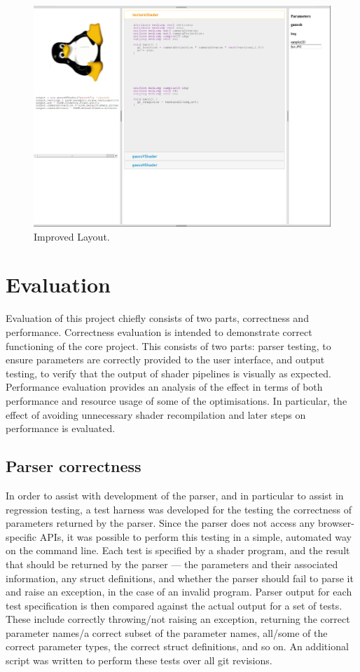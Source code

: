 \documentclass[12pt,twoside,notitlepage]{report}
\begin{document}
\begin{figure}
\centering
\includegraphics[width=150mm]{UI-after.JPG}
\caption{Improved Layout.\label{good-ui}}
\end{figure}

\cleardoublepage
\chapter{Evaluation}
Evaluation of this project chiefly consists of two parts, correctness and performance. Correctness evaluation is intended to demonstrate correct functioning of the core project. This consists of two parts: parser testing, to ensure parameters are correctly provided to the user interface, and output testing, to verify that the output of shader pipelines is visually as expected. Performance evaluation provides an analysis of the effect in terms of both performance and resource usage of some of the optimisations. In particular, the effect of avoiding unnecessary shader recompilation and later steps on performance is evaluated.

\section{Parser correctness}
In order to assist with development of the parser, and in particular to assist in regression testing, a test harness was developed for the testing the correctness of parameters returned by the parser. Since the parser does not access any browser-specific APIs, it was possible to perform this testing in a simple, automated way on the command line. Each test is specified by a shader program, and the result that should be returned by the parser --- the parameters and their associated information, any struct definitions, and whether the parser should fail to parse it and raise an exception, in the case of an invalid program. Parser output for each test specification is then compared against the actual output for a set of tests. These include correctly throwing/not raising an exception, returning the correct parameter names/a correct subset of the parameter names, all/some of the correct parameter types, the correct struct definitions, and so on. An additional script was written to perform these tests over all git revisions. 
\end{document}
